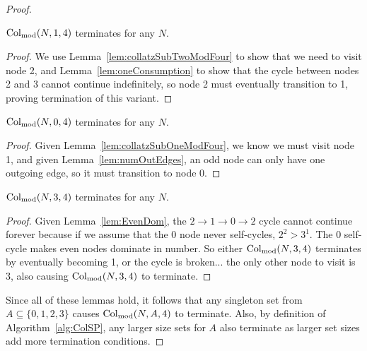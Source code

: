 \begin{proof}
\begin{lemma}
\label{lem:collatzSubOneModFour}
$\mathrm{Col}_{\text{mod}}(N,1,4)$ terminates for any $N$.
\end{lemma}
\begin{proof}
We use Lemma~\ref{lem:collatzSubTwoModFour} to show that we need to visit node 2, and Lemma~\ref{lem:oneConsumption} to show that the cycle between nodes 2 and 3 cannot continue indefinitely, so node 2 must eventually transition to 1, proving termination of this variant.
\end{proof}
\begin{lemma}
\label{lem:collatzSubZeroModFour}
$\mathrm{Col}_{\text{mod}}(N,0,4)$ terminates for any $N$.
\end{lemma}
\begin{proof}
Given Lemma~\ref{lem:collatzSubOneModFour}, we know we must visit node 1, and given Lemma~\ref{lem:numOutEdges}, an odd node can only have one outgoing edge, so it must transition to node 0.
\end{proof}
\begin{lemma}
\label{lem:collatzSubThreeModFour}
$\mathrm{Col}_{\text{mod}}(N,3,4)$ terminates for any $N$.
\end{lemma}
\begin{proof}
Given Lemma~\ref{lem:EvenDom}, the $2 \rightarrow 1 \rightarrow 0 \rightarrow 2$ cycle cannot continue forever because if we assume that the 0 node never self-cycles, $2^2 > 3^1$. The 0 self-cycle makes even nodes dominate in number. So either $\mathrm{Col}_{\text{mod}}(N,3,4)$ terminates by eventually becoming 1, or the cycle is broken... the only other node to visit is 3, also causing $\mathrm{Col}_{\text{mod}}(N,3,4)$ to terminate.
\end{proof}
Since all of these lemmas hold, it follows that any singleton set from $A \subseteq \{0,1,2,3\}$ causes $\mathrm{Col}_{\text{mod}}(N,A,4)$ to terminate. Also, by definition of Algorithm~\ref{alg:ColSP}, any larger size sets for $A$ also terminate as larger set sizes add more termination conditions.
\end{proof}
